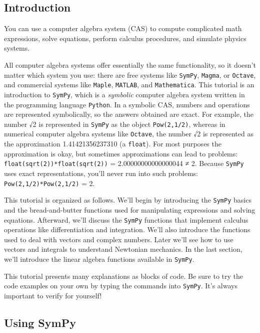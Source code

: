\documentclass{article}
\begin{document}
    \subsection{Introduction}\label{introduction}

    You can use a computer algebra system (CAS) to compute complicated math
expressions, solve equations, perform calculus procedures, and simulate
physics systems.

All computer algebra systems offer essentially the same functionality,
so it doesn't matter which system you use: there are free systems like
\texttt{SymPy}, \texttt{Magma}, or \texttt{Octave}, and commercial
systems like \texttt{Maple}, \texttt{MATLAB}, and \texttt{Mathematica}.
This tutorial is an introduction to \texttt{SymPy}, which is a
\emph{symbolic} computer algebra system written in the programming
language \texttt{Python}. In a symbolic CAS, numbers and operations are
represented symbolically, so the answers obtained are exact. For
example, the number √2 is represented in \texttt{SymPy} as the object
\texttt{Pow(2,1/2)}, whereas in numerical computer algebra systems like
\texttt{Octave}, the number √2 is represented as the approximation
1.41421356237310 (a \texttt{float}). For most purposes the approximation
is okay, but sometimes approximations can lead to problems:
\texttt{float(sqrt(2))*float(sqrt(2))} = 2.00000000000000044 ≠ 2.
Because \texttt{SymPy} uses exact representations, you'll never run into
such problems: \texttt{Pow(2,1/2)*Pow(2,1/2)} = 2.

This tutorial is organized as follows. We'll begin by introducing the
\texttt{SymPy} basics and the bread-and-butter functions used for
manipulating expressions and solving equations. Afterward, we'll discuss
the \texttt{SymPy} functions that implement calculus operations like
differentiation and integration. We'll also introduce the functions used
to deal with vectors and complex numbers. Later we'll see how to use
vectors and integrals to understand Newtonian mechanics. In the last
section, we'll introduce the linear algebra functions available in
\texttt{SymPy}.

This tutorial presents many explanations as blocks of code. Be sure to
try the code examples on your own by typing the commands into
\texttt{SymPy}. It's always important to verify for yourself!

    \subsection{Using SymPy}\label{using-sympy}
\end{document}
